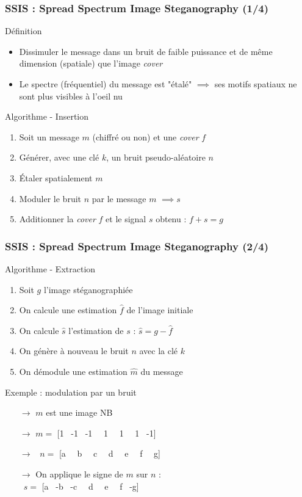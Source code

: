 \documentclass{beamer}
\begin{document}
	\begin{frame}
	\frametitle{SSIS : Spread Spectrum Image Steganography (1/4)}
	\begin{alertblock}{Définition}
   	\rightskip=0pt\leftskip=0pt
	\begin{itemize}
	 	\item Dissimuler le message dans un bruit de faible puissance et de même dimension (spatiale) que l'image \textit{cover}
		\item Le spectre (fréquentiel) du message est "étalé" $\implies$ ses motifs spatiaux ne sont plus visibles à l'oeil nu
	\end{itemize}
	\end{alertblock}
	\begin{alertblock}{Algorithme - Insertion}
	\begin{enumerate}
		\item Soit un message $m$ (chiffré ou non) et une \textit{cover} $f$
		\item Générer, avec une clé $k$, un bruit pseudo-aléatoire $n$
		\item Étaler spatialement $m$
		\item Moduler le bruit $n$ par le message $m$ $\implies s$
		\item Additionner la \textit{cover} $f$ et le signal $s$ obtenu : $f + s = g$
	\end{enumerate}
	\end{alertblock}
	\end{frame}
	
	\begin{frame}
	\frametitle{SSIS : Spread Spectrum Image Steganography (2/4)}
	\begin{alertblock}{Algorithme - Extraction}
	\begin{enumerate}
		\item Soit $g$ l'image stéganographiée
		\item On calcule une estimation $\hat{f}$ de l'image initiale
		\item On calcule $\hat{s}$ l'estimation de $s$ : $\hat{s} = g - \hat{f}$
		\item On génère à nouveau le bruit $n$ avec la clé $k$
		\item On démodule une estimation $\hat{m}$ du message
	\end{enumerate}
	\end{alertblock}

	\begin{exampleblock}{Exemple : modulation par un bruit}
	\begin{itemize}
		\item[$\rightarrow$] $m$ est une image NB
		\item[$\rightarrow$] $m = $ [1~ -1~ -1~~ 1~~ 1~~ 1~ -1]
		\item[$\rightarrow$] ~$n = $ [a ~~b ~~c ~~d ~~e ~~f ~~g]
		\item[$\rightarrow$] On applique le signe de $m$ sur $n$ :\\~$s = $ [a ~-b ~-c ~~d ~~e ~~f ~-g]
	\end{itemize}
	\end{exampleblock}
	\end{frame}
	
\end{document}

